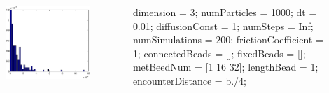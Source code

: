 \documentclass {beamer}
\begin{document}
	\begin{frame}
	\begin{columns}
		\begin{column}{0.5\textwidth}
		\begin{figure}
		\includegraphics[width=1.3\textwidth]{MetTime5.eps}
		\end{figure}		
		\end{column}
		\begin{column}{0.3\textwidth}
		dimension = 3;
		numParticles = 1000;
		dt = 0.01;
		diffusionConst = 1;
		numSteps = Inf;
		\alert{numSimulations = 200};
		frictionCoefficient = 1;
		connectedBeads = [];
		fixedBeads = [];
		metBeedNum = [1 16 32];
		lengthBead = 1;
		\alert {encounterDistance = b./4};
	   
		\end{column}
		\end{columns}
     	\end{frame}
\end{document}
